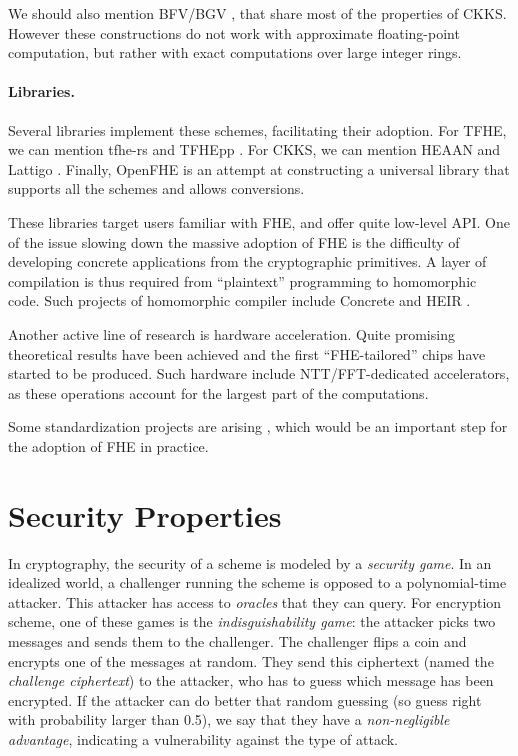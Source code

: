We should also mention BFV/BGV \cite{C:Brakerski12, bgv, EPRINT:FanVer12}, that share most of the properties of CKKS. However these constructions do not work with approximate floating-point computation, but rather with exact computations over large integer rings.


\paragraph{Libraries.}
Several libraries implement these schemes, facilitating their adoption. For TFHE, we can mention tfhe-rs \cite{tfhe-rs}  and TFHEpp \cite{TFHEpp}. For CKKS, we can mention HEAAN \cite{heaan} and Lattigo \cite{lattigo}. Finally, OpenFHE \cite{OpenFHE} is an attempt at constructing a universal library that supports all the schemes and allows conversions.


These libraries target users familiar with FHE, and offer quite low-level API. One of the issue slowing down the massive adoption of FHE is the difficulty of developing concrete applications from the cryptographic primitives. A layer of compilation is thus required from ``plaintext'' programming to homomorphic code. Such projects of homomorphic compiler include Concrete \cite{Concrete} and HEIR \cite{HEIR}.

\medskip
Another active line of research is hardware acceleration. Quite promising theoretical results have been achieved \cite{TCHES:GVPHMS23, EPRINT:BBTV23a, EPRINT:CPBFSJ23, EPRINT:KHMR24} and the first ``FHE-tailored'' chips have started to be produced. Such hardware include NTT/FFT-dedicated accelerators, as these operations account for the largest part of the computations. 


Some standardization projects are arising \cite{HomomorphicEncryptionSecurityStandard, call_nist}, which would be an important step for the adoption of FHE in practice.
 	


\section{Security Properties}


In cryptography, the security of a scheme is modeled by a \textit{security game}. In an idealized world, a challenger running the scheme is opposed to a polynomial-time attacker. This attacker has access to \textit{oracles} that they can query. For encryption scheme, one of these games is the \textit{indisguishability game}: the attacker picks two messages and sends them to the challenger. The challenger flips a coin and encrypts one of the messages at random. They send this ciphertext (named the \textit{challenge ciphertext}) to the attacker, who has to guess which message has been encrypted. If the attacker can do better that random guessing (so guess right with probability larger than 0.5), we say that they have a \textit{non-negligible advantage}, indicating a vulnerability against the type of attack.

